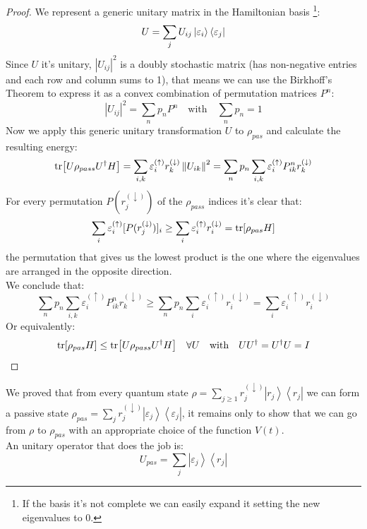\documentclass[12pt,a4paper]{book}
\theoremstyle{definition}
\begin{document}
\begin{proof}
We represent a generic unitary matrix in the Hamiltonian basis \footnote{If the basis it's not complete we can easily expand it setting the new eigenvalues to 0.}:
\begin{equation}
 	U=\sum_{j}U_{ij}\ket{\varepsilon_{i}}\bra{\varepsilon_{j}}
\end{equation}
Since $U$ it's unitary, $|U_{ij}|^2$ is a doubly stochastic matrix (has non-negative entries and each row and column sums to 1), that means we can use the Birkhoff’s Theorem \cite{marshall11} to express it as a convex combination of permutation matrices $P^n$:
\begin{equation} 
	|U_{ij}|^2=\sum_{n} p_{n} P^{n} \quad \text{with} \quad \sum_{n} p_{n} = 1 
\end{equation}
Now we apply this generic unitary transformation $U$ to $\rho_{pas}$ and calculate the resulting energy:
\begin{equation}
	\tr[U \rho_{pass}U^{\dagger} H ]=\sum_{i, k} \varepsilon_{i}^{(\uparrow)} r_{k}^{(\downarrow)}\left\|U_{i k}\right\|^{2}=\sum_{n}p_n \sum_{i, k}\varepsilon_{i}^{(\uparrow)} P^n_{ik}  r_{k}^{(\downarrow)}
\end{equation}
For every permutation $P(r_{j}^{(\downarrow)})$  of the $\rho_{pass}$ indices it's clear that:
\begin{equation}
	\sum_{i}\varepsilon_{i}^{(\uparrow)}[P(r_{j}^{(\downarrow)})]_i \geq \sum_{i}\varepsilon_{i}^{(\uparrow)} r_{i}^{(\downarrow)}=\tr[\rho_{pas}H]
\end{equation}
the permutation that gives us the lowest product is the one where the eigenvalues are arranged in the opposite direction.\\
We conclude that:
\begin{equation}
\sum_{n}p_n \sum_{i, k}\varepsilon_{i}^{(\uparrow)} P^n_{ik}  r_{k}^{(\downarrow)} \ge \sum_{n}p_n \sum_{i}\varepsilon_{i}^{(\uparrow)} r_{i}^{(\downarrow)}=\sum_{i}\varepsilon_{i}^{(\uparrow)} r_{i}^{(\downarrow)}
\end{equation}
Or equivalently:
\begin{equation}
	\tr [\rho_{pas} H]\leq \tr[U \rho_{pass}U^{\dagger} H ] \quad \forall U \quad \text{with} \quad U U^\dagger=U^\dagger U = I
\end{equation}
\end{proof}
We proved that from  every quantum state 	$\rho=\sum_{j \geq 1}  r_{j}^{(\downarrow)}\left|r_{j}\right\rangle\left\langle r_{j}\right| $ we can form a passive state	$\rho_{pas}=\sum_{j} r_{j}^{(\downarrow)}\left|\varepsilon_{j}\right\rangle\left\langle\varepsilon_{j}\right|$, it remains only to show that we can go from $\rho$ to $\rho_{pas}$ with an appropriate choice of the function $V(t)$.\\
An unitary operator that does the job is: 
\begin{equation}\label{eq:upas}
	U_{pas}=\sum_{j}\left|\varepsilon_{j}\right\rangle\left\langle r_{j}\right|
\end{equation}
\end{document}
